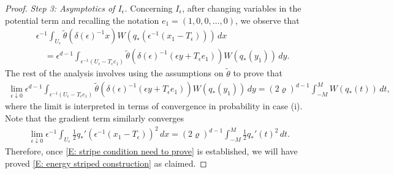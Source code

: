 \documentclass[12pt]{amsart}
\begin{document}
\begin{proof}
	\textit{Step 3: Asymptotics of $I_{\epsilon}$.} Concerning $I_{\epsilon}$, after changing variables in the potential term and recalling the notation $e_{1} = (1,0,0,\dots,0)$, we observe that 
		\begin{align*}
			 &\epsilon^{-1} \int_{U_{\epsilon}} \tilde{\theta}(\delta(\epsilon)^{-1} x) W(q_* (\epsilon^{-1}(x_{1} - T_{\epsilon}))) \, dx \\
			 &\quad = \epsilon^{d-1} \int_{\epsilon^{-1} (U_{\epsilon} - T_{\epsilon} e_{1})} \tilde{\theta}(\delta(\epsilon)^{-1} (\epsilon y + T_{\epsilon} e_{1})) W(q_*(y_{1})) \, dy.
		\end{align*}
	The rest of the analysis involves using the assumptions on $\tilde{\theta}$ to prove that
		\begin{align} \label{E: stripe condition need to prove}
			\lim_{ \epsilon \downarrow 0 } \epsilon^{d-1} \int_{\epsilon^{-1} (U_{\epsilon} - T_{\epsilon} e_{1})} \tilde{\theta}(\delta(\epsilon)^{-1} (\epsilon y + T_{\epsilon} e_{1})) W(q_*(y_{1})) \, dy = (2\varrho)^{d-1} \int_{-M}^{M} W(q_{*}(t)) \, dt,
		\end{align}
	where the limit is interpreted in terms of convergence in probability in case (i).  Note that the gradient term similarly converges
		\begin{align*}
			\lim_{ \epsilon \downarrow 0 }\epsilon^{-1} \int_{U_{\epsilon}} \frac{1}{2} q_{*} '(\epsilon^{-1}(x_{1} - T_{\epsilon}))^{2} \, dx = (2\varrho)^{d-1} \int_{-M}^{M} \frac{1}{2} q_{*}'(t)^{2} \, dt.
		\end{align*}
	Therefore, once \eqref{E: stripe condition need to prove} is established, we will have proved \eqref{E: energy striped construction} as claimed.


\end{proof}
\end{document}
